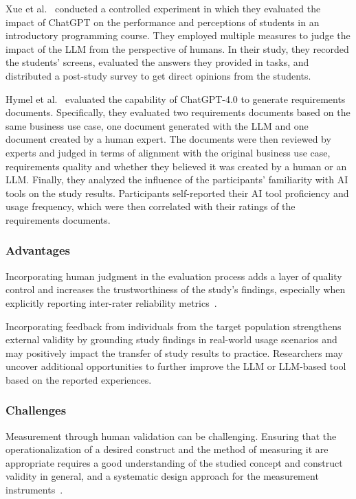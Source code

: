 Xue et al.~\cite{DBLP:conf/icse/XueCBTH24} conducted a controlled experiment in which they evaluated the impact of ChatGPT on the performance and perceptions of students in an introductory programming course.
They employed multiple measures to judge the impact of the LLM from the perspective of humans.
In their study, they recorded the students' screens, evaluated the answers they provided in tasks, and distributed a post-study survey to get direct opinions from the students.

Hymel et al.~\cite{hymel2025analysisllmsvshuman} evaluated the capability of ChatGPT-4.0 to generate requirements documents. 
Specifically, they evaluated two requirements documents based on the same business use case, one document generated with the LLM and one document created by a human expert.
The documents were then reviewed by experts and judged in terms of alignment with the original business use case, requirements quality and whether they believed it was created by a human or an LLM.
Finally, they analyzed the influence of the participants' familiarity with AI tools on the study results.
Participants self-reported their AI tool proficiency and usage frequency, which were then correlated with their ratings of the requirements documents.

\subsubsection{Advantages}

Incorporating human judgment in the evaluation process adds a layer of quality control and increases the trustworthiness of the study's findings, especially when explicitly reporting inter-rater reliability metrics~\cite{khraisha2024canlargelanguagemodelshumans}.

Incorporating feedback from individuals from the target population strengthens external validity by grounding study findings in real-world usage scenarios and may positively impact the transfer of study results to practice.
Researchers may uncover additional opportunities to further improve the LLM or LLM-based tool based on the reported experiences.

\subsubsection{Challenges}

Measurement through human validation can be challenging.
Ensuring that the operationalization of a desired construct and the method of measuring it are appropriate requires a good understanding of the studied concept and construct validity in general, and a systematic design approach for the measurement instruments~\cite{DBLP:journals/tse/SjobergB23}.


